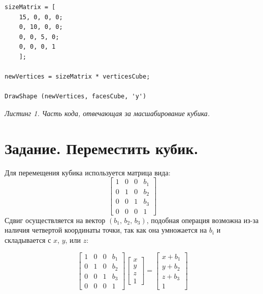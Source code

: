 \documentclass[a5paper, 10pt]{article}
\theoremstyle{definition}
\theoremstyle{plain}
\theoremstyle{remark}
\begin{document}
\begin{center}
\begin{lstlisting}
sizeMatrix = [
    15, 0, 0, 0;
    0, 10, 0, 0;
    0, 0, 5, 0;
    0, 0, 0, 1
    ];

newVertices = sizeMatrix * verticesCube;

DrawShape (newVertices, facesCube, 'y')
\end{lstlisting}
\textit{Листинг 1. Часть кода, отвечающая за масшабирование кубика.}
\end{center}



\newpage
\section{Задание. Переместить кубик.}
Для перемещения кубика используется матрица вида:
\begin{equation}
\begin{bmatrix}
1 & 0 & 0 & b_1\\
0 & 1 & 0 & b_2 \\
0 & 0 & 1 & b_3\\
0 & 0 & 0 & 1
\end{bmatrix}
\end{equation}
Сдвиг осуществляется на вектор $(b_1, \, b_2, \, b_3)$, подобная операция возможна из-за наличия четвертой координаты точки, так как она умножается на $b_i$ и складывается с $x$, $y$, или $z$:

\begin{equation}
\begin{bmatrix}
1 & 0 & 0 & b_1\\
0 & 1 & 0 & b_2 \\
0 & 0 & 1 & b_3\\
0 & 0 & 0 & 1
\end{bmatrix}
\begin{bmatrix}
x\\
y\\
z\\
1
\end{bmatrix}
=
\begin{bmatrix}
x + b_1\\
y + b_2\\
z + b_3\\
1
\end{bmatrix}
\end{equation}
\end{document}

